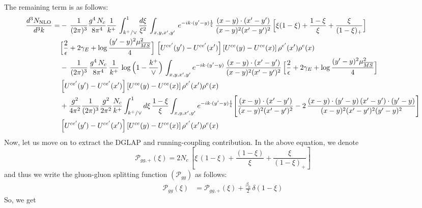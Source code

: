 \documentclass[9pt]{article}
\numberwithin{equation}{section}
\begin{document}
The remaining term is as follows:
\begin{align}\label{eq:remain1}
\frac{d^{3}N_{\rm NLO}}{d^{3}k}=&-\,\frac{1}{(2\pi)^{3}}\frac{g^{4}\,N_{c}}{8\pi^{4}}\frac{1}{k^{+}}\,\int_{k^{+}/\vee}^{1}\frac{d\xi}{\xi^{2}}\,\int_{x,y,x',y'}\,e^{-ik\cdot(y'-y)\frac{1}{\xi}}\,\frac{(x-y)\cdot(x'-y')}{(x-y)^{2}(x'-y')^{2}}\,\Big[\xi(1-\xi)+\frac{1-\xi}{\xi}+\frac{\xi}{(1-\xi)_{+}}\Big]\notag \\ & \Big[\frac{2}{\epsilon}+2\gamma_{E}+\log\frac{(y'-y)^{2}\mu^{2}_{\overline{MS}}}{4}\Big]\,\left[U^{ce'}(y')-U^{ce'}(x')\right]\left[U^{ce}(y)-U^{ce}(x)\right]\rho^{e'}(x')\rho^{e}(x)\notag\\&
-\,\frac{1}{(2\pi)^{3}}\,\frac{g^{4}\,N_{c}}{8\pi^{4}}\,\frac{1}{k^{+}}\,\log\Big(1-\frac{k^{+}}{\vee}\Big)\,\int_{x,y,x',y'}e^{-ik\cdot(y'-y)}\,\frac{(x-y)\cdot(x'-y')}{(x-y)^{2}(x'-y')^{2}}\,\Big[\frac{2}{\epsilon}+2\gamma_{E}+\log\frac{(y'-y)^{2}\mu^{2}_{\overline{MS}}}{4}\Big]\notag \\ & \left[U^{ce'}(y')-U^{ce'}(x')\right]\left[U^{ce}(y)-U^{ce}(x)\right]\rho^{e'}(x')\rho^{e}(x)\notag\\
&+\frac{g^{2}}{4\pi^{2}}\frac{1}{(2\pi)^{3}}\frac{g^{2}}{2\pi^{2}}\frac{N_{c}}{k^{+}}\int_{k^{+}/\vee}^{1}d\xi\,\frac{1-\xi}{\xi}\int_{x,y,x',y'}e^{-ik\cdot(y'-y)\frac{1}{\xi}}\Bigg[\frac{(x-y)\cdot(x'-y')}{(x-y)^{2}(x'-y')^{2}}-2\,\frac{(x-y)\cdot(y'-y)\,(x'-y')\cdot(y'-y)}{(x-y)^{2}(x'-y')^{2}(y'-y)^{2}}\Bigg]\notag \\ & \left[U^{ce'}(y')-U^{ce'}(x')\right]\left[U^{ce}(y)-U^{ce}(x)\right]\rho^{e'}(x')\rho^{e}(x)
\end{align}
Now, let us move on to extract the DGLAP and running-coupling contribution. In the above
equation, we denote
$$\mathcal{P}_{gg,+}(\xi) = 2N_{c}\,\left[\xi\,(1-\xi)+\frac{(1-\xi)}{\xi}+\frac{\xi}{(1-\xi)_{+}}\right]$$
and thus we write the gluon-gluon splitting function $(\mathcal{P}_{gg})$ as follows:
\begin{align}
    \mathcal{P}_{gg}(\xi) & = \mathcal{P}_{gg,+}(\xi) + \frac{\beta_{0}}{2}\, \delta(1-\xi)
\end{align}
So, we get
\end{document}
